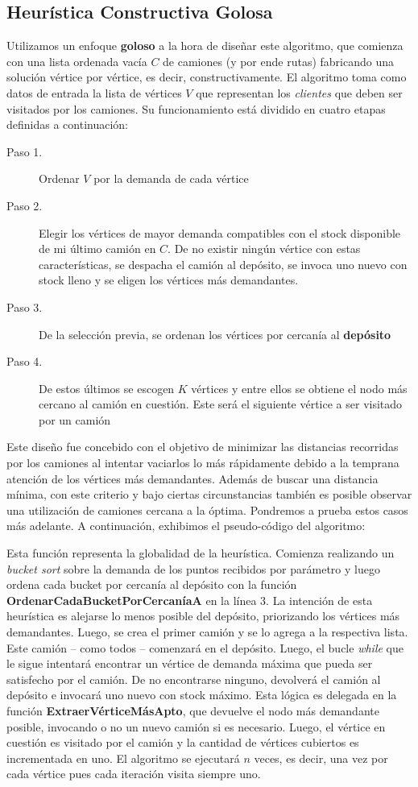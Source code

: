 \subsection{Heurística Constructiva Golosa}
Utilizamos un enfoque \textbf{goloso} a la hora de diseñar este algoritmo, que comienza con una lista ordenada vacía $C$ de camiones (y por ende rutas) fabricando una solución vértice por vértice, es decir, constructivamente. El algoritmo toma como datos de entrada la lista de vértices $V$ que representan los \textit{clientes} que deben ser visitados por los camiones. Su funcionamiento está dividido en cuatro etapas definidas a continuación:

\begin{description}
\item[Paso 1.] Ordenar $V$ por la demanda de cada vértice
\item[Paso 2.] Elegir los vértices de mayor demanda compatibles con el stock disponible de mi último camión en $C$. De no existir ningún vértice con estas características, se despacha el camión al depósito, se invoca uno nuevo con stock lleno y se eligen los vértices más demandantes.
\item[Paso 3.] De la selección previa, se ordenan los vértices por cercanía al \textbf{depósito}
\item[Paso 4.] De estos últimos se escogen $K$ vértices y entre ellos se obtiene el nodo más cercano al camión en cuestión. Este será el siguiente vértice a ser visitado por un camión
\end{description}

Este diseño fue concebido con el objetivo de minimizar las distancias recorridas por los camiones al intentar vaciarlos lo más rápidamente debido a la temprana atención de los vértices más demandantes. Además de buscar una distancia mínima, con este criterio y bajo ciertas circunstancias también es posible observar una utilización de camiones cercana a la óptima. Pondremos a prueba estos casos más adelante. A continuación, exhibimos el pseudo-código del algoritmo:


Esta función representa la globalidad de la heurística. Comienza realizando un \textit{bucket sort} sobre la demanda de los puntos recibidos por parámetro y luego ordena cada bucket por cercanía al depósito con la función \textbf{OrdenarCadaBucketPorCercaníaA} en la línea 3. La intención de esta heurística es alejarse lo menos posible del depósito, priorizando los vértices más demandantes. Luego, se crea el primer camión y se lo agrega a la respectiva lista. Este camión – como todos – comenzará en el depósito. Luego, el bucle \textit{while} que le sigue intentará encontrar un vértice de demanda máxima que pueda ser satisfecho por el camión. De no encontrarse ninguno, devolverá el camión al depósito e invocará uno nuevo con stock máximo. Esta lógica es delegada en la función \textbf{ExtraerVérticeMásApto}, que devuelve el nodo más demandante posible, invocando o no un nuevo camión si es necesario. Luego, el vértice en cuestión es visitado por el camión y la cantidad de vértices cubiertos es incrementada en uno. El algoritmo se ejecutará $n$ veces, es decir, una vez por cada vértice pues cada iteración visita siempre uno.


